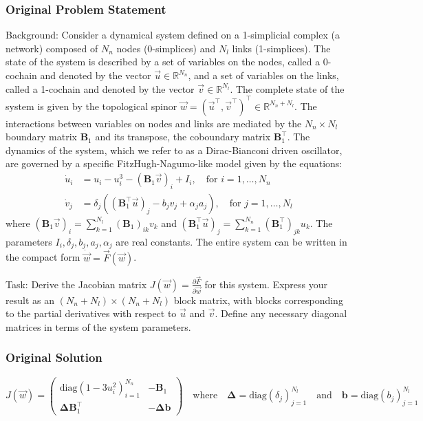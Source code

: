 \documentclass[10pt]{article}
\begin{document}
\subsubsection*{Original Problem Statement}
Background:
Consider a dynamical system defined on a 1-simplicial complex (a network) composed of $N_n$ nodes (0-simplices) and $N_l$ links (1-simplices). The state of the system is described by a set of variables on the nodes, called a 0-cochain and denoted by the vector $\vec{u} \in \mathbb{R}^{N_n}$, and a set of variables on the links, called a 1-cochain and denoted by the vector $\vec{v} \in \mathbb{R}^{N_l}$. The complete state of the system is given by the topological spinor $\vec{w} = (\vec{u}^\top, \vec{v}^\top)^\top \in \mathbb{R}^{N_n+N_l}$. The interactions between variables on nodes and links are mediated by the $N_n \times N_l$ boundary matrix $\boldsymbol{B}_1$ and its transpose, the coboundary matrix $\boldsymbol{B}_1^\top$. The dynamics of the system, which we refer to as a Dirac-Bianconi driven oscillator, are governed by a specific FitzHugh-Nagumo-like model given by the equations:
\begin{align*}
\dot{u}_i &= u_i - u_i^3 - (\boldsymbol{B}_1\vec{v})_i + I_i, \quad \text{for } i=1, \dots, N_n \\
\dot{v}_j &= \delta_j \left( (\boldsymbol{B}_1^\top\vec{u})_j - b_j v_j + \alpha_j a_j \right), \quad \text{for } j=1, \dots, N_l
\end{align*}
where $(\boldsymbol{B}_1\vec{v})_i = \sum_{k=1}^{N_l} (\boldsymbol{B}_1)_{ik} v_k$ and $(\boldsymbol{B}_1^\top\vec{u})_j = \sum_{k=1}^{N_n} (\boldsymbol{B}_1^\top)_{jk} u_k$. The parameters $I_i, \delta_j, b_j, a_j, \alpha_j$ are real constants. The entire system can be written in the compact form $\dot{\vec{w}} = \vec{F}(\vec{w})$.

Task:
Derive the Jacobian matrix $J(\vec{w}) = \frac{\partial \vec{F}}{\partial \vec{w}}$ for this system. Express your result as an $(N_n+N_l) \times (N_n+N_l)$ block matrix, with blocks corresponding to the partial derivatives with respect to $\vec{u}$ and $\vec{v}$. Define any necessary diagonal matrices in terms of the system parameters.

\subsubsection*{Original Solution}
\[ J(\vec{w}) = 
\begin{pmatrix}
\text{diag}(1 - 3u_i^2)_{i=1}^{N_n} & -\boldsymbol{B}_1 \\
\boldsymbol{\Delta} \boldsymbol{B}_1^\top & -\boldsymbol{\Delta} \boldsymbol{b}
\end{pmatrix}
\quad \text{where} \quad
\boldsymbol{\Delta} = \text{diag}(\delta_j)_{j=1}^{N_l} \quad \text{and} \quad \boldsymbol{b} = \text{diag}(b_j)_{j=1}^{N_l} \]
\end{document}
